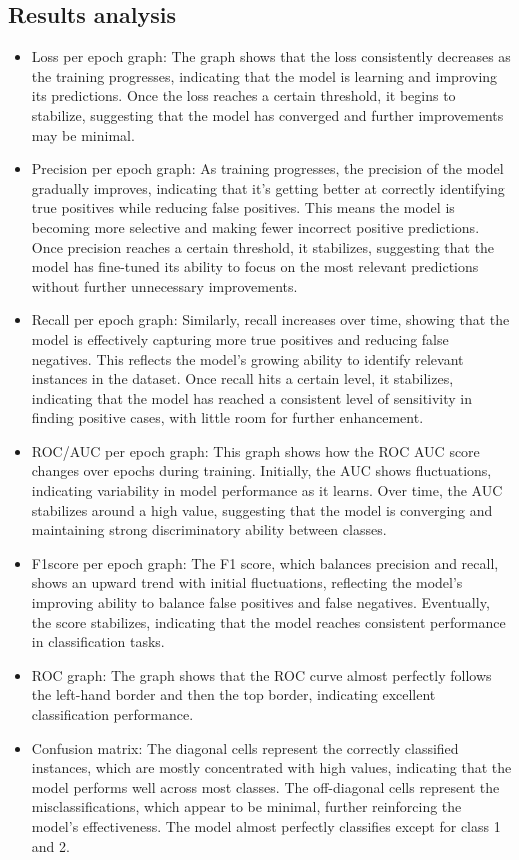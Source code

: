 \documentclass[a4paper,oneside,11pt]{book}
\begin{document}
\subsection{Results analysis}
\begin{itemize}
    \item Loss per epoch graph: The graph shows that the loss consistently decreases as the training progresses, indicating that the model is learning and improving its predictions. Once the loss reaches a certain threshold, it begins to stabilize, suggesting that the model has converged and further improvements may be minimal.
    \item Precision per epoch graph: As training progresses, the precision of the model gradually improves, indicating that it's getting better at correctly identifying true positives while reducing false positives. This means the model is becoming more selective and making fewer incorrect positive predictions. Once precision reaches a certain threshold, it stabilizes, suggesting that the model has fine-tuned its ability to focus on the most relevant predictions without further unnecessary improvements.
    \item Recall per epoch graph: Similarly, recall increases over time, showing that the model is effectively capturing more true positives and reducing false negatives. This reflects the model's growing ability to identify relevant instances in the dataset. Once recall hits a certain level, it stabilizes, indicating that the model has reached a consistent level of sensitivity in finding positive cases, with little room for further enhancement.
    \item ROC/AUC per epoch graph: This graph shows how the ROC AUC score changes over epochs during training. Initially, the AUC shows fluctuations, indicating variability in model performance as it learns. Over time, the AUC stabilizes around a high value, suggesting that the model is converging and maintaining strong discriminatory ability between classes.
    \item F1score per epoch graph: The F1 score, which balances precision and recall, shows an upward trend with initial fluctuations, reflecting the model's improving ability to balance false positives and false negatives. Eventually, the score stabilizes, indicating that the model reaches consistent performance in classification tasks.
    \item ROC graph: The graph shows that the ROC curve almost perfectly follows the left-hand border and then the top border, indicating excellent classification performance.
    \item Confusion matrix: The diagonal cells represent the correctly classified instances, which are mostly concentrated with high values, indicating that the model performs well across most classes. The off-diagonal cells represent the misclassifications, which appear to be minimal, further reinforcing the model's effectiveness. The model almost perfectly classifies except for class 1 and 2.
\end{itemize}
\end{document}
